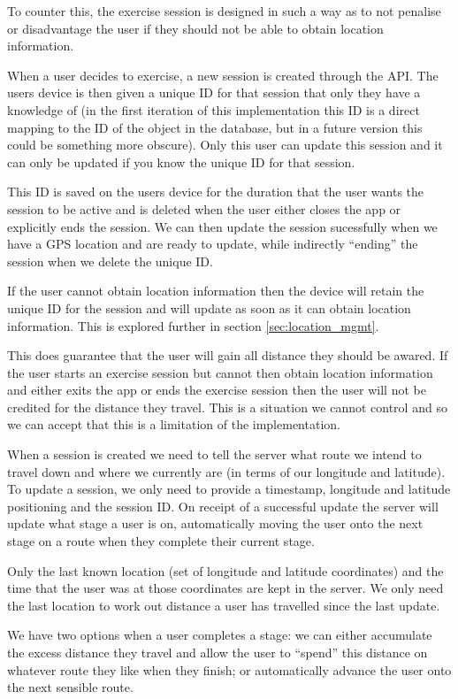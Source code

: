 To counter this, the exercise session is designed in such a way as to
not penalise or disadvantage the user if they should not be able to
obtain location information. 

When a user decides to exercise, a new session is created through the
API. The users device is then given a unique ID for that session that
only they have a knowledge of (in the first iteration of this
implementation this ID is a direct mapping to the ID of the object in
the database, but in a future version this could be something more
obscure). Only this user can update this session and it can only be
updated if you know the unique ID for that session. 

This ID is saved on the users device for the duration that the user
wants the session to be active and is deleted when the user either
closes the app or explicitly ends the session. We can then update the
session sucessfully when we have a GPS location and are ready to
update, while indirectly ``ending'' the session when we delete the
unique ID.

If the user cannot obtain location information then the device will
retain the unique ID for the session and will update as soon as it can
obtain location information. This is explored further in section
\ref{sec:location_mgmt}.

This does guarantee that the user will gain all distance they should
be awared. If the user starts an exercise session but cannot then
obtain location information and either exits the app or ends the
exercise session then the user will not be credited for the distance
they travel. This is a situation we cannot control and so we can
accept that this is a limitation of the implementation.

When a session is created we need to tell the server what route we
intend to travel down and where we currently are (in terms of our
longitude and latitude). To update a session, we only need to provide
a timestamp, longitude and latitude positioning and the session
ID. On receipt of a successful update the server will update what
stage a user is on, automatically moving the user onto the next stage
on a route when they complete their current stage. 

Only the last known location (set of longitude and latitude
coordinates) and the time that the user was at those coordinates are
kept in the server. We only need the last location 
to work out distance a user has travelled since the last update. 

We have two options when a user completes a stage: we can either
accumulate the excess distance they travel and allow the user to
``spend'' this distance on whatever route they like when they finish;
or automatically advance the user onto the next sensible route. 

